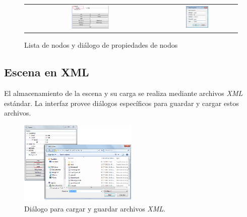 \begin{figure}
	\begin{center}
		\begin{tabular}[c]{cc}
			\includegraphics[width=0.3\textwidth]{./Cap5_vmt/vmt_nodeProperties_1.png}
				&
			\includegraphics[width=0.3\textwidth]{./Cap5_vmt/vmt_nodeProperties_2.png}
		\end{tabular}
	\end{center}
	\caption[Imagen propia.]{Lista de nodos y diálogo de propiedades de nodos}
	\label{fig:VMT-Nodes}
\end{figure}

\subsection{Escena en XML}
El almacenamiento de la escena y su carga se realiza mediante archivos \emph{XML} estándar.
La interfaz provee diálogos específicos para guardar y cargar estos archivos.

\begin{figure}[H]
  \centering
    \includegraphics[width=0.5\textwidth]{./Cap5_vmt/vmt_loadShow.png}
  \caption[Imagen propia.]{Diálogo para cargar y guardar archivos \emph{XML}.}
  \label{fig:VMT-XML}
\end{figure}

